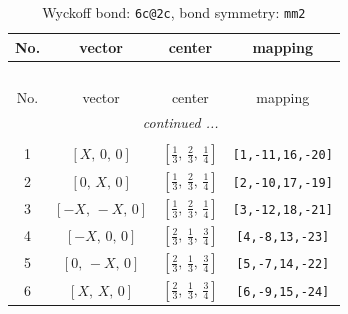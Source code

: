 \documentclass[fleqn,8pt]{jsarticle}
\begin{document}
\begin{longtable}{cccc}
\caption{Wyckoff bond: {\tt 6c@2c}, bond symmetry: {\tt mm2}}
 \\
 \hline \hline
No. & vector & center & mapping \\ \hline \endfirsthead

\multicolumn{3}{l}{\tablename\ \thetable{}} \\
 \hline \hline
No. & vector & center & mapping \\ \hline \endhead

 \hline \hline
\multicolumn{3}{r}{\footnotesize\it continued ...} \\ \endfoot

 \hline \hline
\multicolumn{3}{r}{} \\ \endlastfoot

1 & $\left[ X,\, 0,\, 0 \right]$ & $\left[ \frac{1}{3},\, \frac{2}{3},\, \frac{1}{4} \right]$ & {\tt [1,-11,16,-20]} \\ \hline
2 & $\left[ 0,\, X,\, 0 \right]$ & $\left[ \frac{1}{3},\, \frac{2}{3},\, \frac{1}{4} \right]$ & {\tt [2,-10,17,-19]} \\ \hline
3 & $\left[ - X,\, - X,\, 0 \right]$ & $\left[ \frac{1}{3},\, \frac{2}{3},\, \frac{1}{4} \right]$ & {\tt [3,-12,18,-21]} \\ \hline
4 & $\left[ - X,\, 0,\, 0 \right]$ & $\left[ \frac{2}{3},\, \frac{1}{3},\, \frac{3}{4} \right]$ & {\tt [4,-8,13,-23]} \\ \hline
5 & $\left[ 0,\, - X,\, 0 \right]$ & $\left[ \frac{2}{3},\, \frac{1}{3},\, \frac{3}{4} \right]$ & {\tt [5,-7,14,-22]} \\ \hline
6 & $\left[ X,\, X,\, 0 \right]$ & $\left[ \frac{2}{3},\, \frac{1}{3},\, \frac{3}{4} \right]$ & {\tt [6,-9,15,-24]} \\
\end{longtable}
\renewcommand{\arraystretch}{1.2}
\end{document}
